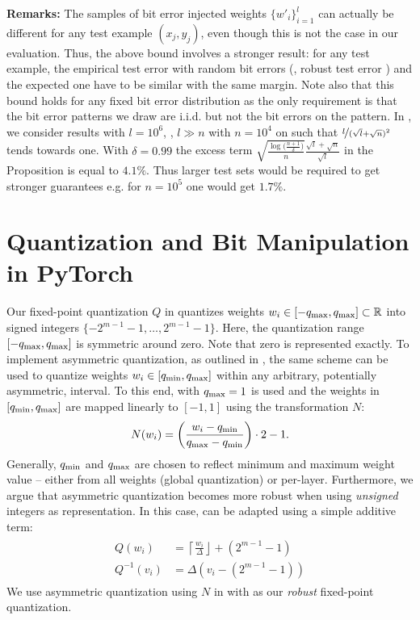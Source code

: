 \textbf{Remarks:}
The samples of bit error injected weights $\{w'_i\}_{i=1}^l$ can actually be different for any test example $(x_j, y_j)$, even though this is not the case in our evaluation. Thus, the above bound involves a stronger result: for any test example, the empirical test error with random bit errors (\ie, robust test error \RTE) and the expected one have to be similar with the same margin. Note also that this bound holds for any fixed bit error distribution as the only requirement is that the bit error patterns we draw are i.i.d. but not the bit errors on the pattern.
In , we consider results with $l = 10^6$, \ie, $l \gg n$ with $n = 10^4$ on \CifarT such that $\nicefrac{l}{(\sqrt{l}+\sqrt{n})^2}$ tends towards one. With $\delta=0.99$ the excess term $\sqrt{\frac{\log\Big(\frac{n+1}{\delta}\Big)}{n}} \frac{\sqrt{l}+\sqrt{n}}{\sqrt{l}}$ in the Proposition is equal to $4.1\%$. Thus larger test sets would be required to get stronger guarantees e.g. for $n=10^5$ one would get $1.7\%$.

\section{Quantization and Bit Manipulation in PyTorch}
\label{sec:supp-implementation}

Our fixed-point quantization $Q$ in  quantizes weights $w_i \in [-\qmax, \qmax] \subset \mathbb{R}$ into signed integers $\{-2^{m-1}-1,\ldots,2^{m-1}-1\}$. Here, the quantization range $[-\qmax,\qmax]$ is symmetric around zero. Note that zero is represented exactly. To implement asymmetric quantization, as outlined in , the same scheme can be used to quantize weights $w_i \in [\qmin, \qmax]$ within any arbitrary, potentially asymmetric, interval. To this end,  with $\qmax = 1$ is used and the weights in $[\qmin,\qmax]$ are mapped linearly to $[-1, 1]$ using the transformation $N$:
\begin{align}
	N(w_i) = \left(\frac{w_i - \qmin}{\qmax - \qmin}\right)\cdot 2 - 1.\label{eq:asymmetric-quantization}
\end{align}
Generally, $\qmin$ and $\qmax$ are chosen to reflect minimum and maximum weight value -- either from all weights (global quantization) or per-layer.
Furthermore, we argue that asymmetric quantization becomes more robust when using \emph{unsigned} integers as representation. In this case,  can be adapted using a simple additive term:
\begin{align}
	\begin{split}
		Q(w_i) &= \left\lceil \frac{w_i}{\Delta}\right\rfloor + (2^{m - 1} - 1)\\
		Q^{-1}(v_i) &= \Delta (v_i - (2^{m - 1} - 1))
	\end{split}\label{eq:unsigned-quantization}
\end{align}
We use asymmetric quantization using $N$ in  with  as our \emph{robust} fixed-point quantization.

